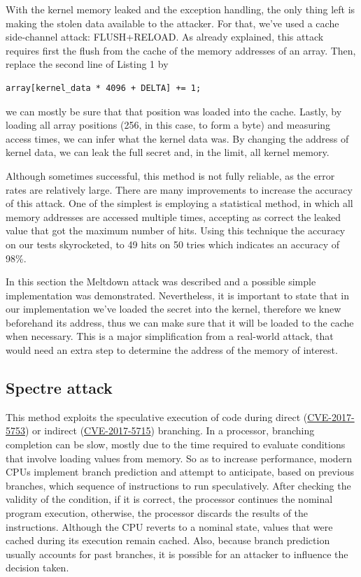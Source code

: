 \documentclass[conference]{IEEEtran}
\begin{document}
\par With the kernel memory leaked and the exception handling, the only thing left is making the stolen data available to the attacker. For that, we've used a cache side-channel attack: FLUSH+RELOAD. As already explained, this attack requires first the flush from the cache of the memory addresses of an array. Then, replace the second line of Listing 1 by
\begin{lstlisting}[style=CStyle, caption=Retrieving the data , label=code_snippet3]
array[kernel_data * 4096 + DELTA] += 1;   
\end{lstlisting}
we can mostly be sure that that position was loaded into the cache. Lastly, by loading all array positions (256, in this case, to form a byte) and measuring access times, we can infer what the kernel data was. By changing the address of kernel data, we can leak the full secret and, in the limit, all kernel memory.
\par Although sometimes successful, this method is not fully reliable, as the error rates are relatively large. There are many improvements to increase the accuracy of this attack. One of the simplest is employing a statistical method, in which all memory addresses are accessed multiple times, accepting as correct the leaked value that got the maximum number of hits. Using this technique the accuracy on our tests skyrocketed, to 49 hits on 50 tries which indicates an accuracy of 98\%.
\par In this section the Meltdown attack was described and a possible simple implementation was demonstrated. Nevertheless, it is important to state that in our implementation we've loaded the secret into the kernel, therefore we knew beforehand its address, thus we can make sure that it will be loaded to the cache when necessary. This is a major simplification from a real-world attack, that would need an extra step to determine the address of the memory of interest.




\subsection{Spectre attack}
This method exploits the speculative execution of code during direct (\href{https://nvd.nist.gov/vuln/detail/CVE-2017-5753}{CVE-2017-5753}) or indirect (\href{https://nvd.nist.gov/vuln/detail/CVE-2017-5715}{CVE-2017-5715}) branching. In a processor, branching completion can be slow, mostly due to the time required to evaluate conditions that involve loading values from memory. So as to increase performance, modern CPUs implement branch prediction and attempt to anticipate, based on previous branches, which sequence of instructions to run speculatively. After checking the validity of the condition, if it is correct, the processor continues the nominal program execution, otherwise, the processor discards the results of the instructions. Although the CPU reverts to a nominal state, values that were cached during its execution remain cached. Also, because branch prediction usually accounts for past branches, it is possible for an attacker to influence the decision taken.
\end{document}
